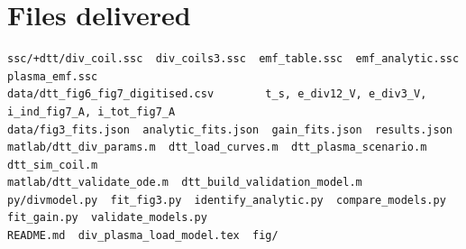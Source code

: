\documentclass[11pt,a4paper]{article}
\begin{document}
\section{Files delivered}
\label{sec:files}
\begin{lstlisting}
ssc/+dtt/div_coil.ssc  div_coils3.ssc  emf_table.ssc  emf_analytic.ssc  plasma_emf.ssc
data/dtt_fig6_fig7_digitised.csv        t_s, e_div12_V, e_div3_V, i_ind_fig7_A, i_tot_fig7_A
data/fig3_fits.json  analytic_fits.json  gain_fits.json  results.json
matlab/dtt_div_params.m  dtt_load_curves.m  dtt_plasma_scenario.m  dtt_sim_coil.m
matlab/dtt_validate_ode.m  dtt_build_validation_model.m
py/divmodel.py  fit_fig3.py  identify_analytic.py  compare_models.py  fit_gain.py  validate_models.py
README.md  div_plasma_load_model.tex  fig/
\end{lstlisting}
\end{document}
